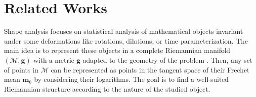 


        
    


\vspace{-1ex}

\vspace{-1ex}

\section{Related Works}
\vspace{-1ex}
Shape analysis focuses on statistical analysis of mathematical objects invariant under some deformations like rotations, dilations, or time parameterization.
 The main idea is to represent these objects in a complete Riemannian manifold $(\mathcal{M},\mathbf{g})$ with a metric $\mathbf{g}$ adapted to the geometry of the problem \cite{miller2006geodesic}.
 Then, any set of points in $\mathcal{M}$ can be represented as points in the tangent space of their Frechet mean $\mathbf{m}_0$ \cite{pal2017riemannian,le2001locating} by considering their logarithms.
 The goal is to find a well-suited Riemannian structure according to the nature of the studied object.
 
